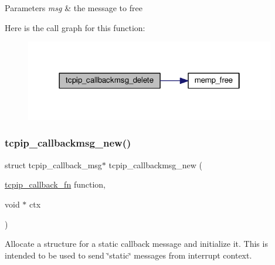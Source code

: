 \begin{DoxyParams}{Parameters}
{\em msg} & the message to free \\
\hline
\end{DoxyParams}
Here is the call graph for this function\+:
\nopagebreak
\begin{figure}[H]
\begin{center}
\leavevmode
\includegraphics[width=310pt]{openmote-cc2538_2lwip_2src_2api_2tcpip_8c_ac5b7a59f4c3f5f721ab9ee81f231c9fd_cgraph}
\end{center}
\end{figure}
\mbox{\label{openmote-cc2538_2lwip_2src_2api_2tcpip_8c_aee14fa2587a9ba9d23e4c7e16c4526ac}} 
\subsubsection{\texorpdfstring{tcpip\+\_\+callbackmsg\+\_\+new()}{tcpip\_callbackmsg\_new()}}
{\footnotesize\ttfamily struct tcpip\+\_\+callback\+\_\+msg$\ast$ tcpip\+\_\+callbackmsg\+\_\+new (\begin{DoxyParamCaption}\item[{\hyperlink{openmote-cc2538_2lwip_2src_2include_2lwip_2tcpip_8h_a35203296bb838f3b493839ffc6e7285d}{tcpip\+\_\+callback\+\_\+fn}}]{function,  }\item[{void $\ast$}]{ctx }\end{DoxyParamCaption})}

Allocate a structure for a static callback message and initialize it. This is intended to be used to send \char`\"{}static\char`\"{} messages from interrupt context.


